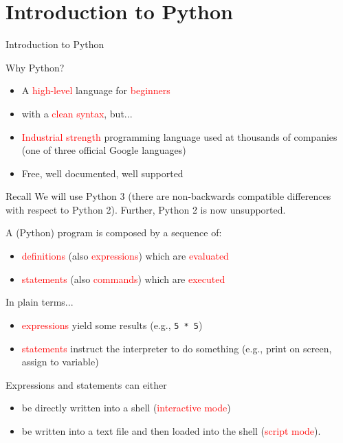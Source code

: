 \documentclass[t,handout,9pt]{beamer}
\begin{document}
\section{Introduction to Python}
\begin{frame}{Introduction to Python}
\begin{center}Why Python?\end{center}
\vfill
\begin{itemize}
	\item A \textcolor{red}{high-level} language for \textcolor{red}{beginners}
	\item with a \textcolor{red}{clean syntax}, but...
	\item \textcolor{red}{Industrial strength} programming language used at thousands of companies (one of three official Google languages)
	\item Free, well documented, well supported
\end{itemize}
\vfill
\begin{block}{Recall}
We will use Python 3 (there are non-backwards compatible differences with respect to Python 2). Further, Python 2 is now unsupported.
\end{block}
\vfill
\end{frame}
%
\begin{frame}
\vfill
A (Python) program is composed by a sequence of:
\begin{itemize}
	\item \textcolor{red}{definitions} (also \textcolor{red}{expressions}) which are \textcolor{red}{evaluated}
	\item \textcolor{red}{statements} (also \textcolor{red}{commands}) which are \textcolor{red}{executed}
\end{itemize}
\vfill
In plain terms...
\begin{itemize}
	\item \textcolor{red}{expressions} yield some results (e.g., \texttt{5 * 5})
	\item \textcolor{red}{statements} instruct the interpreter to do something (e.g., print on screen, assign to variable)
\end{itemize}
\vfill
Expressions and statements can either
\begin{itemize}
	\item be directly written into a shell (\textcolor{red}{interactive mode})
	\item be written into a text file and then loaded into the shell (\textcolor{red}{script mode}).
\end{itemize}
\vfill
\end{frame}
\end{document}
